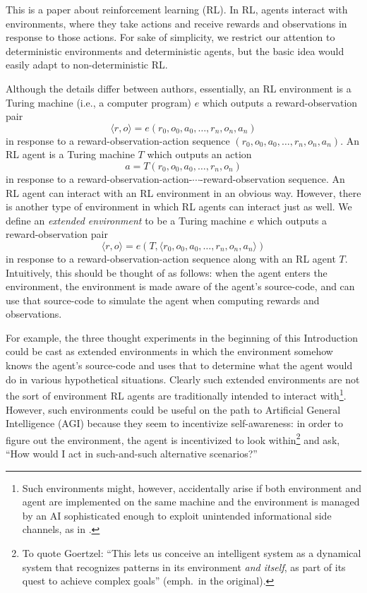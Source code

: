 \documentclass[runningheads]{llncs}
\begin{document}
This is a paper about reinforcement learning (RL).
In RL, agents interact with environments, where they take actions and
receive rewards and observations in response to those actions.
For sake of simplicity, we restrict our attention
to deterministic environments and deterministic agents, but the basic idea
would easily adapt
to non-deterministic RL.

Although the details differ between authors, essentially,
an RL environment is a Turing machine (i.e., a computer program)
$e$ which outputs a reward-observation pair
\[
  \langle r,o\rangle=e(r_0,o_0,a_0,\ldots,r_n,o_n,a_n)
\]
in response to a
reward-observation-action sequence $(r_0,o_0,a_0,\ldots,r_n,o_n,a_n)$.
An RL agent is a Turing machine $T$ which outputs an action
\[
  a=T(r_0,o_0,a_0,\ldots,r_n,o_n)
\]
in response to a
reward-observation-action-$\cdots$-reward-observation sequence.
An RL agent can interact with an RL environment in an obvious way.
However, there is another type of environment in which
RL agents can interact just as well. We define an \emph{extended
environment} to be a Turing machine $e$ which outputs a reward-observation pair
\[
    \langle r,o\rangle=e(T,\langle r_0,o_0,a_0,\ldots,r_n,o_n,a_n \rangle)
\]
in response
to a reward-observation-action sequence
along with an RL agent $T$.
Intuitively, this should be thought of as follows: when the agent enters the environment,
the environment is made aware of the agent's source-code, and can use that
source-code to simulate the agent when computing rewards and observations.

For example, the three thought experiments in the beginning of this Introduction could
be cast as extended environments in which the environment somehow knows the agent's
source-code and uses that to determine what the agent would do in various
hypothetical situations.
Clearly such
extended environments are not the sort of environment RL agents are traditionally
intended to interact with\footnote{Such environments might, however,
accidentally arise if both environment
and agent are implemented on the same machine and the environment is managed by an AI
sophisticated enough to exploit unintended informational side channels, as in
\cite{yampolskiy2012leakproofing}.}. However, such environments could be
useful on the path to Artificial
General Intelligence (AGI) because they seem to incentivize self-awareness:
in order to figure out the environment, the agent is incentivized to look
within\footnote{To quote Goertzel: ``This lets us conceive an intelligent system
as a dynamical system that recognizes patterns in its environment \emph{and itself},
as part of its quest to achieve complex goals'' \cite{goertzel2006patterns}
(emph.\ in the original).}
and ask, ``How would I act in such-and-such alternative scenarios?''
\end{document}
